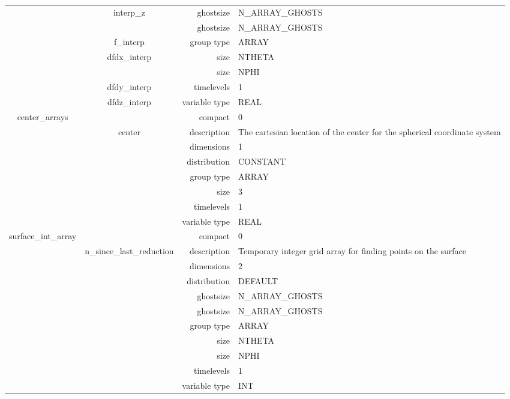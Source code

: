 \begin{tabular*}{150mm}{|c|c@{\extracolsep{\fill}}|rl|}
 & interp\_z & ghostsize & N\_ARRAY\_GHOSTS \\ 
& ~ & ghostsize & N\_ARRAY\_GHOSTS \\ 
 & f\_interp & group type & ARRAY \\ 
 & dfdx\_interp & size & NTHETA \\ 
& ~ & size & NPHI \\ 
 & dfdy\_interp & timelevels & 1 \\ 
 & dfdz\_interp & variable type & REAL \\ 
\hline 
center\_arrays &  & compact & 0 \\ 
 & center & description & The cartesian location of the center for the spherical coordinate system \\ 
 &  & dimensions & 1 \\ 
 &  & distribution & CONSTANT \\ 
 &  & group type & ARRAY \\ 
 &  & size & 3 \\ 
 &  & timelevels & 1 \\ 
 &  & variable type & REAL \\ 
\hline 
surface\_int\_array &  & compact & 0 \\ 
 & n\_since\_last\_reduction & description & Temporary integer grid array for finding points on the surface \\ 
 &  & dimensions & 2 \\ 
 &  & distribution & DEFAULT \\ 
 &  & ghostsize & N\_ARRAY\_GHOSTS \\ 
& ~ & ghostsize & N\_ARRAY\_GHOSTS \\ 
 &  & group type & ARRAY \\ 
 &  & size & NTHETA \\ 
& ~ & size & NPHI \\ 
 &  & timelevels & 1 \\ 
 &  & variable type & INT \\ 
\hline 
\end{tabular*} 



\vspace{5mm}
\vspace{5mm}

